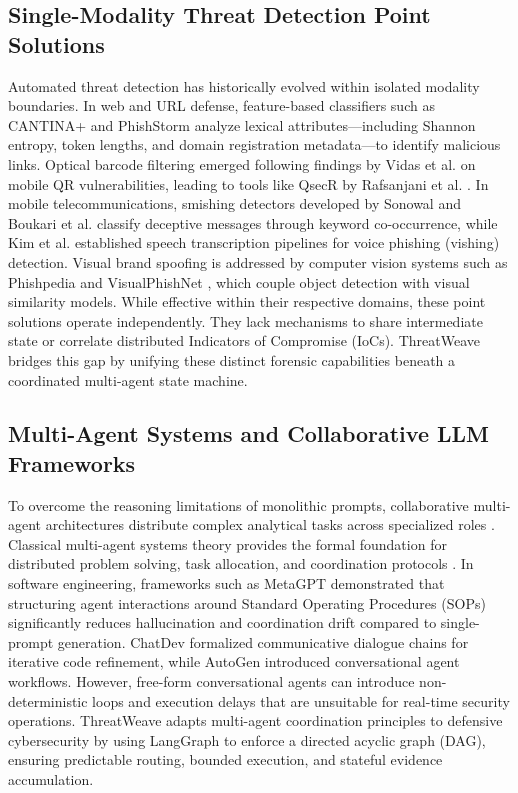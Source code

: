 \documentclass[conference]{IEEEtran}
\begin{document}
\subsection{Single-Modality Threat Detection Point Solutions}
Automated threat detection has historically evolved within isolated modality boundaries. In web and URL defense, feature-based classifiers such as CANTINA+ \cite{xiang2011cantina} and PhishStorm \cite{marchal2014phishstorm} analyze lexical attributes—including Shannon entropy, token lengths, and domain registration metadata—to identify malicious links. Optical barcode filtering emerged following findings by Vidas et al. \cite{vidas2013qrishing} on mobile QR vulnerabilities, leading to tools like QsecR by Rafsanjani et al. \cite{rafsanjani2023qsecr}. In mobile telecommunications, smishing detectors developed by Sonowal \cite{sonowal2020smishing} and Boukari et al. \cite{boukari2021smishing} classify deceptive messages through keyword co-occurrence, while Kim et al. \cite{kim2021vishing} established speech transcription pipelines for voice phishing (vishing) detection. Visual brand spoofing is addressed by computer vision systems such as Phishpedia \cite{lin2021phishpedia} and VisualPhishNet \cite{abdelnabi2020visualphishnet}, which couple object detection with visual similarity models. While effective within their respective domains, these point solutions operate independently. They lack mechanisms to share intermediate state or correlate distributed Indicators of Compromise (IoCs). ThreatWeave bridges this gap by unifying these distinct forensic capabilities beneath a coordinated multi-agent state machine.

\subsection{Multi-Agent Systems and Collaborative LLM Frameworks}
To overcome the reasoning limitations of monolithic prompts, collaborative multi-agent architectures distribute complex analytical tasks across specialized roles \cite{wang2024surveyagents}. Classical multi-agent systems theory provides the formal foundation for distributed problem solving, task allocation, and coordination protocols \cite{wooldridge2009multiagent}. In software engineering, frameworks such as MetaGPT \cite{hong2024metagpt} demonstrated that structuring agent interactions around Standard Operating Procedures (SOPs) significantly reduces hallucination and coordination drift compared to single-prompt generation. ChatDev \cite{qian2024chatdev} formalized communicative dialogue chains for iterative code refinement, while AutoGen \cite{wu2023autogen} introduced conversational agent workflows. However, free-form conversational agents can introduce non-deterministic loops and execution delays that are unsuitable for real-time security operations. ThreatWeave adapts multi-agent coordination principles to defensive cybersecurity by using LangGraph to enforce a directed acyclic graph (DAG), ensuring predictable routing, bounded execution, and stateful evidence accumulation.
\end{document}
